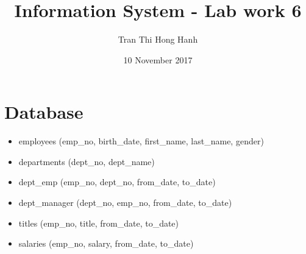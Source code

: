 \documentclass{article}
\title{Information System - Lab work 6}
\author{Tran Thi Hong Hanh}
\date{10 November 2017}
\begin{document}
\maketitle
\section*{Database}
\begin{itemize}
	\item employees (emp\_no, birth\_date, first\_name, last\_name, gender)
	\item departments (dept\_no, dept\_name)
	\item dept\_emp (emp\_no, dept\_no, from\_date, to\_date)
	\item dept\_manager (dept\_no, emp\_no, from\_date, to\_date)
	\item titles (emp\_no, title, from\_date, to\_date)
	\item salaries (emp\_no, salary, from\_date, to\_date)
\end{itemize}
\end{document}
